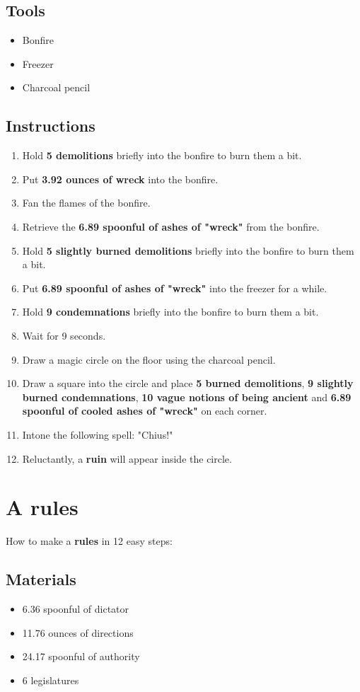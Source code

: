 \documentclass{article}
\begin{document}
\subsection{Tools}\begin{itemize}
\item 
Bonfire
\item 
Freezer
\item 
Charcoal pencil
\end{itemize}
\subsection{Instructions}\begin{enumerate}
\item 
Hold \textbf{5 demolitions} briefly into the bonfire to burn them a bit.
\item 
Put \textbf{3.92 ounces of wreck} into the bonfire.
\item 
Fan the flames of the bonfire.
\item 
Retrieve the \textbf{6.89 spoonful of ashes of "wreck"} from the bonfire.
\item 
Hold \textbf{5 slightly burned demolitions} briefly into the bonfire to burn them a bit.
\item 
Put \textbf{6.89 spoonful of ashes of "wreck"} into the freezer for a while.
\item 
Hold \textbf{9 condemnations} briefly into the bonfire to burn them a bit.
\item 
Wait for 9 seconds.
\item 
Draw a magic circle on the floor using the charcoal pencil.
\item 
Draw a square into the circle and place \textbf{5 burned demolitions}, \textbf{9 slightly burned condemnations}, \textbf{10 vague notions of being ancient} and \textbf{6.89 spoonful of cooled ashes of "wreck"} on each corner.
\item 
Intone the following spell: "Chius!"
\item 
Reluctantly, a \textbf{ruin} will appear inside the circle.
\end{enumerate}
\newpage
\section{A rules}How to make a \textbf{rules} in 12 easy steps:

\subsection{Materials}\begin{itemize}
\item 
6.36 spoonful of dictator
\item 
11.76 ounces of directions
\item 
24.17 spoonful of authority
\item 
6 legislatures
\end{itemize}
\end{document}
